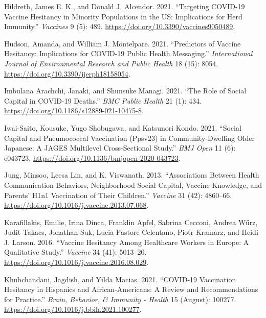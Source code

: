 \documentclass[
]{article}
\newlength{\cslhangindent}
\newlength{\cslentryspacingunit} %
\newenvironment{CSLReferences}[2] %
 {%
  \setlength{\parindent}{0pt}
  \ifodd #1
  \let\oldpar\par
  \def\par{\hangindent=\cslhangindent\oldpar}
  \fi
  \setlength{\parskip}{#2\cslentryspacingunit}
 }%
 {}
\begin{document}
\begin{CSLReferences}{1}{0}
\leavevmode{}%
Hildreth, James E. K., and Donald J. Alcendor. 2021. {``Targeting
{COVID}-19 {Vaccine} {Hesitancy} in {Minority} {Populations} in the
{US}: {Implications} for {Herd} {Immunity}.''} \emph{Vaccines} 9 (5):
489. \url{https://doi.org/10.3390/vaccines9050489}.

\leavevmode{}%
Hudson, Amanda, and William J. Montelpare. 2021. {``Predictors of
{Vaccine} {Hesitancy}: {Implications} for {COVID}-19 {Public} {Health}
{Messaging}.''} \emph{International Journal of Environmental Research
and Public Health} 18 (15): 8054.
\url{https://doi.org/10.3390/ijerph18158054}.

\leavevmode{}%
Imbulana Arachchi, Janaki, and Shunsuke Managi. 2021. {``The Role of
Social Capital in {COVID}-19 Deaths.''} \emph{BMC Public Health} 21 (1):
434. \url{https://doi.org/10.1186/s12889-021-10475-8}.

\leavevmode{}%
Iwai-Saito, Kousuke, Yugo Shobugawa, and Katsunori Kondo. 2021.
{``Social Capital and Pneumococcal Vaccination ({Ppsv23}) in
Community-Dwelling Older {Japanese}: A {JAGES} Multilevel
Cross-Sectional Study.''} \emph{BMJ Open} 11 (6): e043723.
\url{https://doi.org/10.1136/bmjopen-2020-043723}.

\leavevmode{}%
Jung, Minsoo, Leesa Lin, and K. Viswanath. 2013. {``Associations Between
Health Communication Behaviors, Neighborhood Social Capital, Vaccine
Knowledge, and Parents' {H1n1} Vaccination of Their Children.''}
\emph{Vaccine} 31 (42): 4860--66.
\url{https://doi.org/10.1016/j.vaccine.2013.07.068}.

\leavevmode{}%
Karafillakis, Emilie, Irina Dinca, Franklin Apfel, Sabrina Cecconi,
Andrea Wűrz, Judit Takacs, Jonathan Suk, Lucia Pastore Celentano, Piotr
Kramarz, and Heidi J. Larson. 2016. {``Vaccine Hesitancy Among
Healthcare Workers in {Europe}: {A} Qualitative Study.''} \emph{Vaccine}
34 (41): 5013--20. \url{https://doi.org/10.1016/j.vaccine.2016.08.029}.

\leavevmode{}%
Khubchandani, Jagdish, and Yilda Macias. 2021. {``{COVID}-19 Vaccination
Hesitancy in {Hispanics} and {African}-{Americans}: {A} Review and
Recommendations for Practice.''} \emph{Brain, Behavior, \& Immunity -
Health} 15 (August): 100277.
\url{https://doi.org/10.1016/j.bbih.2021.100277}.


\end{CSLReferences}
\end{document}
